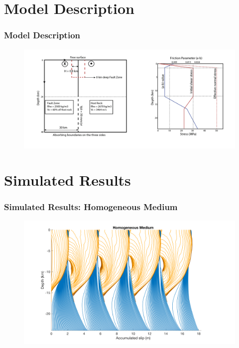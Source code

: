\documentclass{beamer}
\begin{document}
\section{Model Description}
\begin{frame}
    \frametitle{Model Description}
    \begin{figure}
        \includegraphics[width=0.9\linewidth]{images/model_setup}
    \end{figure}
\end{frame}

\section{Simulated Results}
\begin{frame}
    \frametitle{Simulated Results: Homogeneous Medium}
    \begin{figure}
        \includegraphics[width=0.9\linewidth]{images/cumslipHomo.png} 
    \end{figure}
\end{frame}
\end{document}
